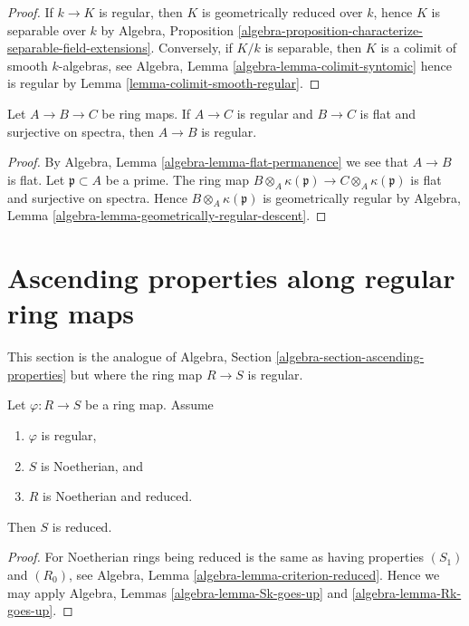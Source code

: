 \begin{proof}
If $k \to K$ is regular, then $K$ is geometrically reduced over $k$,
hence $K$ is separable over $k$ by
Algebra, Proposition
\ref{algebra-proposition-characterize-separable-field-extensions}.
Conversely, if $K/k$ is separable, then $K$ is a colimit of smooth
$k$-algebras, see
Algebra, Lemma \ref{algebra-lemma-colimit-syntomic}
hence is regular by
Lemma \ref{lemma-colimit-smooth-regular}.
\end{proof}

\begin{lemma}
\label{lemma-regular-permanence}
Let $A \to B \to C$ be ring maps. If $A \to C$ is regular and $B \to C$
is flat and surjective on spectra, then $A \to B$ is regular.
\end{lemma}

\begin{proof}
By Algebra, Lemma \ref{algebra-lemma-flat-permanence} we see that
$A \to B$ is flat. Let $\mathfrak p \subset A$ be a prime. The ring
map $B \otimes_A \kappa(\mathfrak p) \to C \otimes_A \kappa(\mathfrak p)$
is flat and surjective on spectra. Hence $B \otimes_A \kappa(\mathfrak p)$
is geometrically regular by
Algebra, Lemma \ref{algebra-lemma-geometrically-regular-descent}.
\end{proof}




\section{Ascending properties along regular ring maps}
\label{section-ascending-properties}

\noindent
This section is the analogue of
Algebra, Section \ref{algebra-section-ascending-properties}
but where the ring map $R \to S$ is regular.

\begin{lemma}
\label{lemma-reduced-goes-up}
Let $\varphi : R \to S$ be a ring map. Assume
\begin{enumerate}
\item $\varphi$ is regular,
\item $S$ is Noetherian, and
\item $R$ is Noetherian and reduced.
\end{enumerate}
Then $S$ is reduced.
\end{lemma}

\begin{proof}
For Noetherian rings being reduced is the same as having properties
$(S_1)$ and $(R_0)$, see
Algebra, Lemma \ref{algebra-lemma-criterion-reduced}.
Hence we may apply
Algebra, Lemmas \ref{algebra-lemma-Sk-goes-up} and
\ref{algebra-lemma-Rk-goes-up}.
\end{proof}







